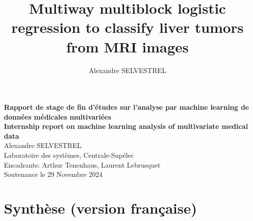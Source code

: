 \documentclass[preprint,12pt]{elsarticle}
\begin{document}
\title{Multiway multiblock logistic regression to classify liver tumors from MRI images} %


\author{Alexandre SELVESTREL} %


            \begin{center}
              \vspace*{2cm}
              {\LARGE \textbf{Rapport de stage de fin d'études sur l'analyse par machine learning de données médicales multivariées}} \\[7em]
              {\LARGE \textbf{Internship report on machine learning analysis of multivariate medical data}}\\[5em]
              {\large Alexandre SELVESTREL}\\[1em]
              {\large Laboratoire des systèmes, Centrale-Supélec}\\[1em]
              {\large Encadrants: Arthur Tenenhaus, Laurent Lebrusquet}\\
              \vspace*{\fill}
              Soutenance le 29 Novembre 2024
          \end{center}

\newpage
{} 
\section*{Synthèse (version française)}
\vspace*{10 pt}
\end{document}
